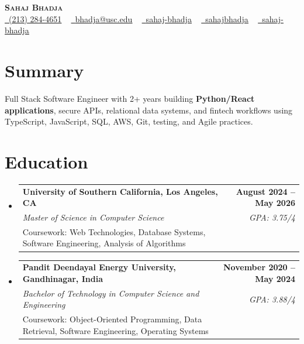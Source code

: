 \documentclass[letterpaper,10pt]{article}
\makeatletter
\newcommand{\sectionGap}{\vspace{-8pt}}
\newcommand{\resumeEduSubheading}[5]{\vspace{-1pt}\item\begin{tabular*}{1.0\textwidth}[t]{l@{\extracolsep{\fill}}r}\textbf{#1} & \textbf{\small #2} \\\textit{\small #3} & \textit{\small #4} \\\small #5 & \\\end{tabular*}\vspace{-4pt}}
\newcommand{\resumeSubHeadingListStart}{\begin{itemize}[leftmargin=0.0in, label={}]}
\newcommand{\resumeSubHeadingListEnd}{\end{itemize}}
\makeatother
\begin{document}
\begin{center}
{\Huge \scshape \textbf{Sahaj Bhadja}} \\ \vspace{1pt}
\small \href{tel:2132844651}{\faPhone\ \underline{(213) 284-4651}} ~ \href{mailto:bhadja@usc.edu}{\raisebox{-0.2\height}\faEnvelope\ \underline{bhadja@usc.edu}} ~
\href{https://www.linkedin.com/in/sahaj-bhadja/}{\raisebox{-0.2\height}\faLinkedin\ \underline{sahaj-bhadja}} ~ \href{https://github.com/SAHAJ-BHADJA}{\raisebox{-0.2\height}\faGithub\ \underline{sahajbhadja}} ~
\href{https://sahaj-bhadja.vercel.app/}{\raisebox{-0.2\height}\faGlobe\ \underline{sahaj-bhadja}}
\end{center}
\vspace{-16pt}
\section{Summary}
\begin{itemize}[leftmargin=0.15in, label={}]
\small{\item{Full Stack Software Engineer with 2+ years building \textbf{Python/React applications}, secure APIs, relational data systems, and fintech workflows using TypeScript, JavaScript, SQL, AWS, Git, testing, and Agile practices.}}
\end{itemize}
\sectionGap
\section{Education}
\resumeSubHeadingListStart
\resumeEduSubheading{University of Southern California, Los Angeles, CA}{August 2024 -- May 2026}{Master of Science in Computer Science}{GPA: 3.75/4}{Coursework: Web Technologies, Database Systems, Software Engineering, Analysis of Algorithms}
\resumeEduSubheading{Pandit Deendayal Energy University, Gandhinagar, India}{November 2020 -- May 2024}{Bachelor of Technology in Computer Science and Engineering}{GPA: 3.88/4}{Coursework: Object-Oriented Programming, Data Retrieval, Software Engineering, Operating Systems}
\resumeSubHeadingListEnd
\sectionGap
\end{document}
